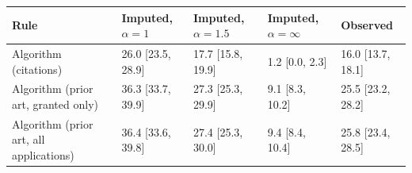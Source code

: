 \begin{tabular}{lllll}
\toprule
Rule & Imputed, $\alpha = 1$ & Imputed, $\alpha = 1.5$ & Imputed, $\alpha = \infty$ & Observed \\
\midrule
Algorithm (citations) & 26.0 [23.5, 28.9] & 17.7 [15.8, 19.9] & 1.2 [0.0, 2.3] & 16.0 [13.7, 18.1] \\
Algorithm (prior art, granted only) & 36.3 [33.7, 39.9] & 27.3 [25.3, 29.9] & 9.1 [8.3, 10.2] & 25.5 [23.2, 28.2] \\
Algorithm (prior art, all applications) & 36.4 [33.6, 39.8] & 27.4 [25.3, 30.0] & 9.4 [8.4, 10.4] & 25.8 [23.4, 28.5] \\
\bottomrule
\end{tabular}
